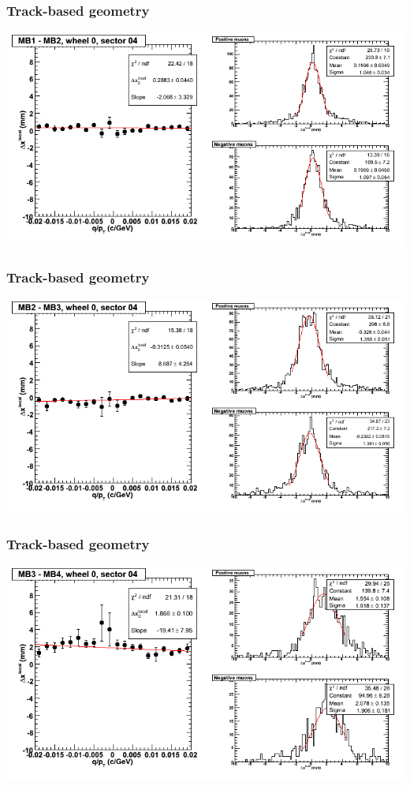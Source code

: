 \documentclass[compress]{beamer}
\begin{document}
\begin{frame}
\frametitle{Track-based geometry}
\includegraphics[width=\linewidth]{NOV4_segdiffs/dt13_resid_C_04_12.png}
\end{frame}

\begin{frame}
\frametitle{Track-based geometry}
\includegraphics[width=\linewidth]{NOV4_segdiffs/dt13_resid_C_04_23.png}
\end{frame}

\begin{frame}
\frametitle{Track-based geometry}
\includegraphics[width=\linewidth]{NOV4_segdiffs/dt13_resid_C_04_34.png}
\end{frame}
\end{document}
